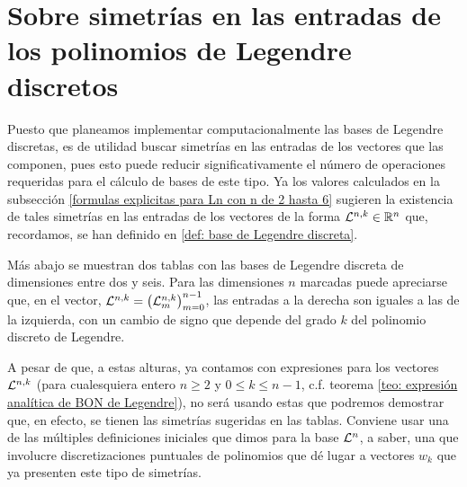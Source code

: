 \chapter{Sobre simetrías en las entradas de los polinomios de Legendre discretos}
\label{section: sobre simetrias en las entradas de los poliomios discretos de Legendre}
Puesto que planeamos implementar computacionalmente
las bases de Legendre discretas, es de utilidad 
buscar simetrías en las entradas de los vectores que las 
componen, pues esto puede reducir significativamente
el número de operaciones requeridas para el cálculo 
de bases de este tipo.
Ya los valores calculados
en la subsección 
\ref{formulas explicitas para Ln con n de 2 hasta 6}
sugieren 
la existencia de tales simetrías en las entradas 
de los vectores de la forma $\mathcal{L}^{n,k} \in \mathbb{R}^{n}$
que, recordamos, se han definido en 
\ref{def: base de Legendre discreta}.

 
Más abajo se muestran dos tablas con las bases de Legendre
discreta de dimensiones entre dos y seis. 		
Para las dimensiones $n$ marcadas
puede apreciarse que, en el vector,
$\mathcal{L}^{n,k} = \left( \mathcal{L}^{n,k}_{m} \right)_{m=0}^{n-1}$,
las entradas a la derecha son iguales a las de la izquierda,
con un cambio de signo que depende del
grado $k$ del polinomio discreto de Legendre.

A pesar de que, a estas alturas, ya contamos
con expresiones para los vectores $\mathcal{L}^{n,k}$
(para cualesquiera entero $n \geq 2$ y $0 \leq k \leq n-1$,
c.f. teorema \ref{teo: expresión analítica de BON de Legendre}),
no será usando estas que podremos demostrar que, en efecto,
se tienen las simetrías sugeridas en las tablas.
Conviene
usar una de las múltiples definiciones iniciales
que dimos para la base $\mathcal{L}^{n}$, a saber, una
que involucre discretizaciones puntuales de polinomios 
que dé lugar a vectores $w_{k}$ que ya presenten 
este tipo de simetrías.


